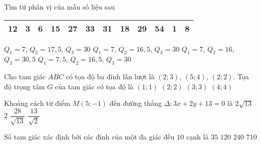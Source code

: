 \begin{ex}%
	Tìm tứ phân vị của mẫu số liệu sau
	\begin{center}
	\begin{tabular}{|c|c|c|c|c|c|c|c|c|c|c|c|}
		\hline
		12&3&6&15&27&33&31&18&29&54&1&8\\
		\hline
	\end{tabular}
	\end{center}
	\choice
	{$Q_1=7$, $Q_2=17{,}5$, $Q_3=30$}
	{\True $Q_1=7$, $Q_2=16{,}5$, $Q_3=30$}
	{$Q_1=7$, $Q_2=16$, $Q_3=30{,}5$}
	{$Q_1=7{,}5$, $Q_2=16{,}5$, $Q_3=30$}
\end{ex}
\begin{ex}%
	Cho tam giác $ABC$ có tọa độ ba đỉnh lần lượt là $(2;3)$, $(5;4)$, $(2;2)$. Tọa độ trọng tâm $G$ của tam giác có tọa độ là
	\choice
	{$(1;1)$}
	{$(2;2)$}
	{\True $(3;3)$}
	{$(4;4)$}
\end{ex}
\begin{ex}%
	Khoảng cách từ điểm $M(5;-1)$ đến đường thẳng $\Delta\colon 3x+2y+13=0$ là
	\choice
	{\True $2\sqrt{13}$}
	{$2$}
	{$\dfrac{28}{\sqrt{13}}$}
	{$\dfrac{13}{\sqrt{2}}$}
\end{ex}
\begin{ex}%
	Số tam giác xác định bởi các đỉnh của một đa giác đều $10$ cạnh là
	\choice
	{$35$}
	{\True $120$}
	{$240$}
	{$710$}
\end{ex}
